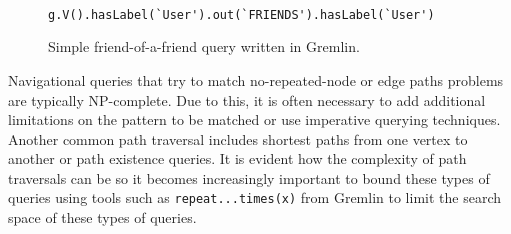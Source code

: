 \begin{figure}
    \centering
    \begin{verbatim}
        g.V().hasLabel(`User').out(`FRIENDS').hasLabel(`User')
    \end{verbatim}
    \caption{Simple friend-of-a-friend query written in Gremlin.}
    \label{lst:gremlin-nav-1}
\end{figure}

Navigational queries that try to match no-repeated-node or edge paths problems are typically NP-complete. Due to this, it is often necessary to add additional limitations on the pattern to be matched or use imperative querying techniques. Another common path traversal includes shortest paths from one vertex to another or path existence queries. It is evident how the complexity of path traversals can be so it becomes increasingly important to bound these types of queries using tools such as \texttt{repeat...times(x)} from Gremlin to limit the search space of these types of queries.
